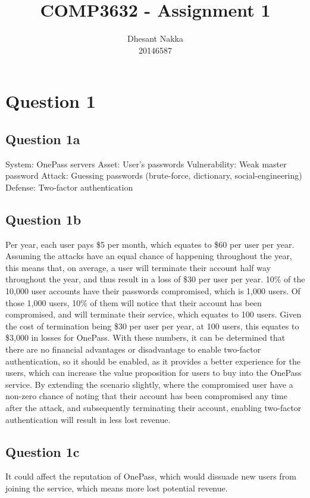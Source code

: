 \documentclass[12pt,a4paper]{article}
\title{COMP3632 - Assignment 1}
\author{Dhesant Nakka\\20146587}
\begin{document}
\maketitle

\section{Question 1}
\subsection{Question 1a}
System: OnePass servers
Asset: User's passwords
Vulnerability: Weak master password
Attack: Guessing passwords (brute-force, dictionary, social-engineering)
Defense: Two-factor authentication

\subsection{Question 1b}
Per year, each user pays \$5 per month, which equates to \$60 per user per  year. Assuming the attacks have an equal chance of happening throughout the year, this means that, on average, a user will terminate their account half way throughout the year, and thus result in a loss of \$30 per user per year. 10\% of the 10,000 user accounts have their passwords compromised, which is 1,000 users. Of those 1,000 users, 10\% of them will notice that their account has been compromised, and will terminate their service, which equates to 100 users. Given the cost of termination being \$30 per user per year, at 100 users, this equates to \$3,000 in losses for OnePass. With these numbers, it can be determined that there are no financial advantages or disadvantage to enable two-factor authentication, so it should be enabled, as it provides a better experience for the users, which can increase the value proposition for users to buy into the OnePass service. By extending the scenario slightly, where the compromised user have a non-zero chance of noting that their account has been compromised any time after the attack, and subsequently terminating their account, enabling two-factor authentication will result in less lost revenue.

\subsection{Question 1c}
It could affect the reputation of OnePass, which would dissuade new users from joining the service, which means more lost potential revenue.
\end{document}
